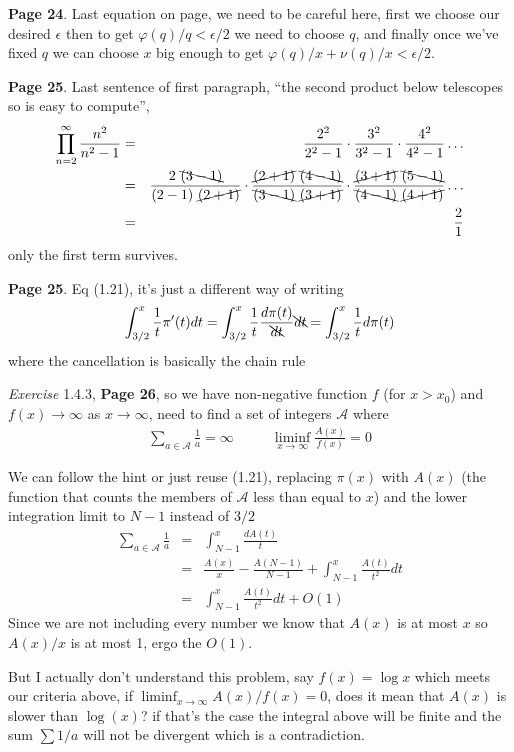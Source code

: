 \documentclass[aps,preprint,preprintnumbers,nofootinbib,showpacs,prd]{revtex4-1}
\newcommand{\nbea}{\begin{eqnarray*}}
\newcommand{\neea}{\end{eqnarray*}}
\begin{document}
{\bf Page 24}. Last equation on page, we need to be careful here, first we choose our desired $\epsilon$ then to get $\varphi(q)/q < \epsilon/2$ we need to choose $q$, and finally once we've fixed $q$ we can choose $x$ big enough to get $\varphi(q)/x + \nu(q)/x < \epsilon/2$.

{\bf Page 25}. Last sentence of first paragraph, ``the second product below telescopes so is easy to compute'', 
%
\nbea
\prod_{n=2}^\infty \frac{n^2}{n^2 - 1} & = & \frac{2^2}{2^2-1} \cdot \frac{3^2}{3^2 - 1} \cdot \frac{4^2}{4^2 - 1} \dots \\
& = & \frac{2~\bcancel{(3-1)}}{(2-1)~\cancel{(2+1)}} \cdot \frac{\cancel{(2+1)}~\bcancel{(4-1)}}{\bcancel{(3 - 1)}~\cancel{(3 + 1)}} \cdot \frac{\cancel{(3+1)}~\bcancel{(5-1)}}{\bcancel{(4 - 1)}~\cancel{(4+1)}} \dots \\
& = & \frac{2}{1}
\neea
%
only the first term survives.

{\bf Page 25}. Eq (1.21), it's just a different way of writing
%
\nbea
\int_{3/2}^x \frac{1}{t} \pi'(t) dt = \int_{3/2}^x \frac{1}{t} \frac{d\pi(t)}{\bcancel{dt}} \bcancel{dt} = \int_{3/2}^x \frac{1}{t} d\pi(t)
\neea
%
where the cancellation is basically the chain rule

{\it Exercise} 1.4.3, {\bf Page 26}, so we have non-negative function $f$ (for $x > x_0$) and $f(x)\to\infty$ as $x\to\infty$, need to find a set of integers $\mathcal{A}$ where
%
\nbea
\sum_{a\in\mathcal{A}} \frac{1}{a} = \infty ~~~~~~~~~~~~ \liminf_{x\to\infty}\frac{A(x)}{f(x)} = 0
\neea
%

We can follow the hint or just reuse (1.21), replacing $\pi(x)$ with $A(x)$ (the function that counts the members of $\mathcal{A}$ less than equal to $x$) and the lower integration limit to $N-1$ instead of $3/2$
%
\nbea
\sum_{a\in\mathcal{A}} \frac{1}{a} & = & \int_{N-1}^{x} \frac{dA(t)}{t} \\
& = & \frac{A(x)}{x} - \frac{A(N-1)}{N-1} + \int_{N-1}^x \frac{A(t)}{t^2}dt \\
& = & \int_{N-1}^x \frac{A(t)}{t^2}dt + O(1)
\neea
%
Since we are not including every number we know that $A(x)$ is at most $x$ so $A(x)/x$ is at most 1, ergo the $O(1)$.

But I actually don't understand this problem, say $f(x) = \log x$ which meets our criteria above, if $\liminf_{x\to\infty} A(x)/f(x) = 0$, does it mean that $A(x)$ is slower than $\log(x)$? if that's the case the integral above will be finite and the sum $\sum 1/a$ will not be divergent which is a contradiction.
\end{document}
